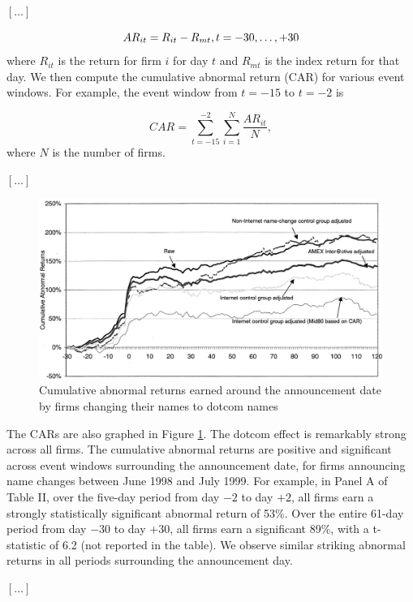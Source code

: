 \documentclass[12pt,a4paper]{article}
\begin{document}
$[\ldots]$

\begin{equation}
AR_{it} = R_{it} - R_{mt}, \vspace{1cm} t = -30, \ldots, +30
\end{equation}
where $R_{it}$ is the return for firm $i$ for day $t$ and $R_{mt}$ is the index return for that day. We then compute the cumulative abnormal return (CAR) for various event windows. For example, the event window from $t = -15$ to $t =-2$ is

\begin{equation}
CAR = \displaystyle\sum_{t=-15}^{-2} \displaystyle\sum_{i=1}^N \frac{AR_{it}}{N},
\end{equation}
where $N$ is the number of firms.

$[\ldots]$

\begin{figure}[h]
\includegraphics[width=\textwidth]{event_1}
\caption{Cumulative abnormal returns earned around the announcement date by firms changing their names to dotcom names}
\label{fig:cars}
\end{figure}

The CARs are also graphed in Figure \ref{fig:cars}. The dotcom effect is remarkably strong across all firms. The cumulative abnormal returns are positive and significant across event windows surrounding the announcement date, for firms announcing name changes between June 1998 and July 1999. For example, in Panel A of Table II, over the five-day period from day $-2$ to day $+2$, all firms earn a strongly statistically significant abnormal return of 53\%. Over the entire 61-day period from day $-30$ to day $+30$, all firms earn a significant 89\%, with a t-statistic of 6.2 (not reported in the table). We observe similar striking abnormal returns in all periods surrounding the announcement day.

$[\ldots]$

\newpage
\printbibliography
\end{document}
